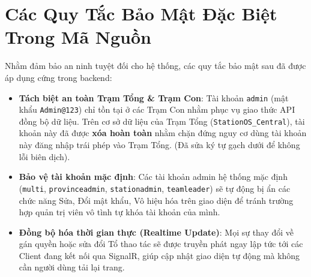 \documentclass[12pt]{article}
\begin{document}
\section{Các Quy Tắc Bảo Mật Đặc Biệt Trong Mã Nguồn}
Nhằm đảm bảo an ninh tuyệt đối cho hệ thống, các quy tắc bảo mật sau đã được áp dụng cứng trong backend:

\begin{itemize}
    \item \textbf{Tách biệt an toàn Trạm Tổng \& Trạm Con}: Tài khoản \texttt{admin} (mật khẩu \texttt{Admin@123}) chỉ tồn tại ở các Trạm Con nhằm phục vụ giao thức API đồng bộ dữ liệu. Trên cơ sở dữ liệu của Trạm Tổng (\texttt{StationOS\_Central}), tài khoản này đã được \textbf{xóa hoàn toàn} nhằm chặn đứng nguy cơ dùng tài khoản này đăng nhập trái phép vào Trạm Tổng. (Đã sửa ký tự gạch dưới để không lỗi biên dịch).
    \item \textbf{Bảo vệ tài khoản mặc định}: Các tài khoản admin hệ thống mặc định (\texttt{multi}, \texttt{provinceadmin}, \texttt{stationadmin}, \texttt{teamleader}) sẽ tự động bị ẩn các chức năng Sửa, Đổi mật khẩu, Vô hiệu hóa trên giao diện để tránh trường hợp quản trị viên vô tình tự khóa tài khoản của mình.
    \item \textbf{Đồng bộ hóa thời gian thực (Realtime Update)}: Mọi sự thay đổi về gán quyền hoặc sửa đổi Tổ thao tác sẽ được truyền phát ngay lập tức tới các Client đang kết nối qua SignalR, giúp cập nhật giao diện tự động mà không cần người dùng tải lại trang.
\end{itemize}
\end{document}
